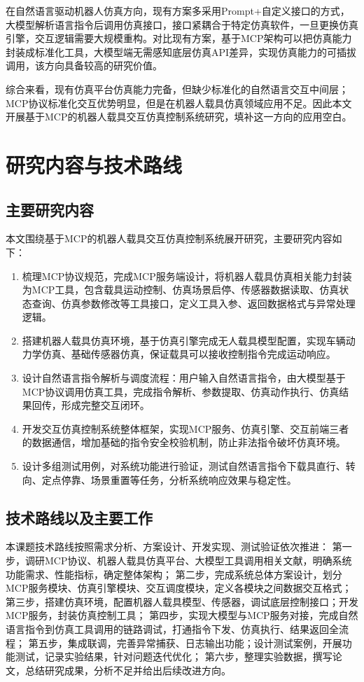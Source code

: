 在自然语言驱动机器人仿真方向，现有方案多采用Prompt+自定义接口的方式，大模型解析语言指令后调用仿真接口，接口紧耦合于特定仿真软件，一旦更换仿真引擎，交互逻辑需要大规模重构。对比现有方案，基于MCP架构可以把仿真能力封装成标准化工具，大模型端无需感知底层仿真API差异，实现仿真能力的可插拔调用，该方向具备较高的研究价值。

综合来看，现有仿真平台仿真能力完备，但缺少标准化的自然语言交互中间层；MCP协议标准化交互优势明显，但是在机器人载具仿真领域应用不足。因此本文开展基于MCP的机器人载具交互仿真控制系统研究，填补这一方向的应用空白。

\section{研究内容与技术路线}
\subsection{主要研究内容}
本文围绕基于MCP的机器人载具交互仿真控制系统展开研究，主要研究内容如下：
\begin{enumerate}
    \item 梳理MCP协议规范，完成MCP服务端设计，将机器人载具仿真相关能力封装为MCP工具，包含载具运动控制、仿真场景启停、传感器数据读取、仿真状态查询、仿真参数修改等工具接口，定义工具入参、返回数据格式与异常处理逻辑。
    \item 搭建机器人载具仿真环境，基于仿真引擎完成无人载具模型配置，实现车辆动力学仿真、基础传感器仿真，保证载具可以接收控制指令完成运动响应。
    \item 设计自然语言指令解析与调度流程：用户输入自然语言指令，由大模型基于MCP协议调用仿真工具，完成指令解析、参数提取、仿真动作执行、仿真结果回传，形成完整交互闭环。
    \item 开发交互仿真控制系统整体框架，实现MCP服务、仿真引擎、交互前端三者的数据通信，增加基础的指令安全校验机制，防止非法指令破坏仿真环境。
    \item 设计多组测试用例，对系统功能进行验证，测试自然语言指令下载具直行、转向、定点停靠、场景重置等任务，分析系统响应效果与稳定性。
\end{enumerate}

\subsection{技术路线以及主要工作}
本课题技术路线按照需求分析、方案设计、开发实现、测试验证依次推进：
第一步，调研MCP协议、机器人载具仿真平台、大模型工具调用相关文献，明确系统功能需求、性能指标，确定整体架构；
第二步，完成系统总体方案设计，划分MCP服务模块、仿真引擎模块、交互调度模块，定义各模块之间数据交互格式；
第三步，搭建仿真环境，配置机器人载具模型、传感器，调试底层控制接口；开发MCP服务，封装仿真控制工具；
第四步，实现大模型与MCP服务对接，完成自然语言指令到仿真工具调用的链路调试，打通指令下发、仿真执行、结果返回全流程；
第五步，集成联调，完善异常捕获、日志输出功能；设计测试案例，开展功能测试，记录实验结果，针对问题迭代优化；
第六步，整理实验数据，撰写论文，总结研究成果，分析不足并给出后续改进方向。

